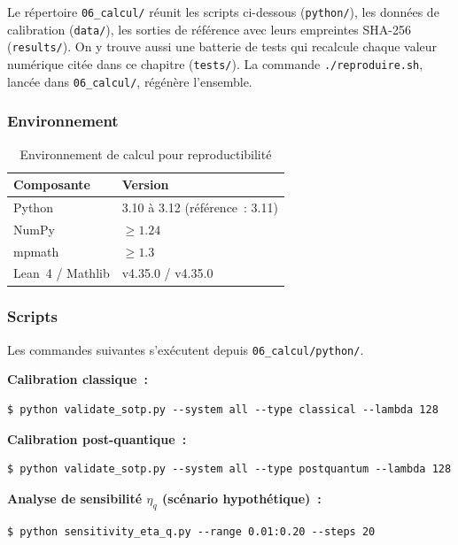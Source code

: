 \begin{sloppypar}
Le r\'epertoire \texttt{06\_calcul/} r\'eunit les
scripts ci-dessous (\texttt{python/}), les donn\'ees de calibration (\texttt{data/}),
les sorties de r\'ef\'erence avec leurs empreintes SHA-256 (\texttt{results/}). On y trouve aussi une
batterie de tests qui recalcule chaque valeur num\'erique cit\'ee dans ce chapitre
(\texttt{tests/}). La commande \texttt{./reproduire.sh}, lanc\'ee dans
\texttt{06\_calcul/}, r\'eg\'en\`ere l'ensemble.

\subsubsection{Environnement}
\label{subsec:environnement}

\begin{table}[htbp]
\centering
\caption{Environnement de calcul pour reproductibilit\'e}
\label{tab:environnement_calcul}
\begin{tabular}{@{}ll@{}}
\toprule
\textbf{Composante} & \textbf{Version} \\
\midrule
Python & 3.10 \`a 3.12 (r\'ef\'erence~: 3.11) \\
NumPy & $\geq 1.24$ \\
mpmath & $\geq 1.3$ \\
Lean~4 / Mathlib & v4.35.0 / v4.35.0 \\
\bottomrule
\end{tabular}
\end{table}

\subsubsection{Scripts}
\label{subsec:scripts_validation}

Les commandes suivantes s'ex\'ecutent depuis \texttt{06\_calcul/python/}.

\noindent\textbf{Calibration classique~:}
\begin{verbatim}
$ python validate_sotp.py --system all --type classical --lambda 128
\end{verbatim}

\noindent\textbf{Calibration post-quantique~:}
\begin{verbatim}
$ python validate_sotp.py --system all --type postquantum --lambda 128
\end{verbatim}

\noindent\textbf{Analyse de sensibilit\'e $\eta_q$ (sc\'enario hypoth\'etique)~:}
\begin{verbatim}
$ python sensitivity_eta_q.py --range 0.01:0.20 --steps 20
\end{verbatim}
\end{sloppypar}

